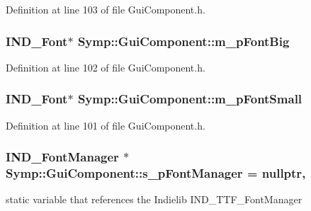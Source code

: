 Definition at line 103 of file Gui\-Component.\-h.

\hypertarget{class_symp_1_1_gui_component_a784e1d58bb695ca95f12c1611f144488}{
\subsubsection[{m\-\_\-p\-Font\-Big}]{\setlength{\rightskip}{0pt plus 5cm}I\-N\-D\-\_\-\-Font$\ast$ Symp\-::\-Gui\-Component\-::m\-\_\-p\-Font\-Big\hspace{0.3cm}{\ttfamily [protected]}}}\label{class_symp_1_1_gui_component_a784e1d58bb695ca95f12c1611f144488}


Definition at line 102 of file Gui\-Component.\-h.

\hypertarget{class_symp_1_1_gui_component_a9704a149c8207503b3a7824b096b7b9f}{
\subsubsection[{m\-\_\-p\-Font\-Small}]{\setlength{\rightskip}{0pt plus 5cm}I\-N\-D\-\_\-\-Font$\ast$ Symp\-::\-Gui\-Component\-::m\-\_\-p\-Font\-Small\hspace{0.3cm}{\ttfamily [protected]}}}\label{class_symp_1_1_gui_component_a9704a149c8207503b3a7824b096b7b9f}


Definition at line 101 of file Gui\-Component.\-h.

\hypertarget{class_symp_1_1_gui_component_a4c817ae1da9423d19b7d7455c29c614a}{
\subsubsection[{s\-\_\-p\-Font\-Manager}]{\setlength{\rightskip}{0pt plus 5cm}I\-N\-D\-\_\-\-Font\-Manager $\ast$ Symp\-::\-Gui\-Component\-::s\-\_\-p\-Font\-Manager = nullptr\hspace{0.3cm}{\ttfamily [static]}, {\ttfamily [protected]}}}\label{class_symp_1_1_gui_component_a4c817ae1da9423d19b7d7455c29c614a}
static variable that references the Indielib I\-N\-D\-\_\-\-T\-T\-F\-\_\-\-Font\-Manager 

